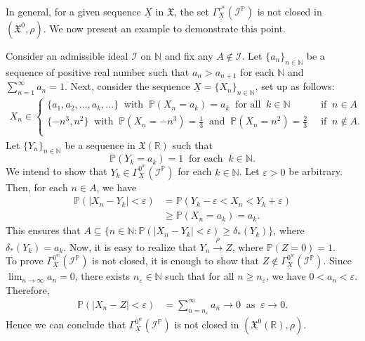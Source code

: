 \documentclass[reqno]{amsart}
\begin{document}
In general, for a given sequence $\underline{X}$ in $\mathfrak{X}$, the set $\Gamma^{r^w}_{\underline{X}}(\mathcal{I}^{\mathbb{P}})$ is not closed in $(\mathfrak{X^0},\rho)$. We now present an example to demonstrate this point.
\begin{example}\label{not closed}
	Consider an admissible ideal $\mathcal{I}$ on $\mathbb{N}$ and fix any $A\notin\mathcal{I}$. Let $\{a_n\}_{n\in\mathbb{N}}$ be a sequence  of positive real number such that $a_n>a_{n+1}$ for each $\mathbb{N}$ and $\displaystyle\sum_{n=1}^{\infty}a_n=1$.  Next, consider the sequence $\underline{X}=\{X_n\}_{n\in\mathbb{N}}$, set up as follows:
	\begin{align*}
		X_{n}\in
		\begin{cases}
			\{a_1,a_2,...,a_k,...\}~\mbox{ with }~ \mathbb{P}(X_n=a_k)=a_k~\mbox{ for all }~k\in\mathbb{N}~&\mbox{ if }	~n\in A\\
			\{-n^3,n^2\}~\mbox{ with }~ \mathbb{P}(X_n=-n^3)=\frac{1}{3}~\mbox{ and }~\mathbb{P}(X_n=n^2)=\frac{2}{3}~&\mbox{ if }~n\notin A.\\
		\end{cases}
	\end{align*}
	Let $\{Y_n\}_{n\in\mathbb{N}}$ be a sequence in $\mathfrak{X}(\mathbb{R})$ such that 
	$$
	\mathbb{P}(Y_k=a_k)=1~\mbox{ for each }~k\in\mathbb{N}.
	$$
	We intend to show that $Y_k\in \Gamma^{0^w}_{\underline{X}}(\mathcal{I}^{\mathbb{P}})$ for each $k\in\mathbb{N}$. Let $\varepsilon>0$ be arbitrary. Then, for each $n\in A$, we have
	\begin{align*}
		\mathbb{P}(|X_n-Y_k|<\varepsilon)&=\mathbb{P}(Y_k-\varepsilon<X_n<Y_k+\varepsilon)\\
		&\geq \mathbb{P}(X_n=a_k)=a_k.
	\end{align*}
	This ensures that $A\subseteq \{n\in\mathbb{N}:\mathbb{P}(|X_n-Y_k|<\varepsilon)\geq \delta_{*}(Y_k)\}$, where $\delta_{*}(Y_k)=a_k$. 
	Now, it is easy to realize that $Y_n\xrightarrow{\rho} Z$, where $\mathbb{P}(Z=0)=1$.\\
	
To prove $\Gamma^{0^w}_{\underline{X}}(\mathcal{I}^{\mathbb{P}})$ is not closed, it is enough to show that $Z\notin \Gamma^{0^w}_{\underline{X}}(\mathcal{I}^{\mathbb{P}})$.
	Since $\displaystyle\lim_{n\to\infty}a_n=0$, there exists $n_{\varepsilon}\in\mathbb{N}$ such that for all $n\geq n_{\varepsilon}$, we have  $0<a_n<\varepsilon$.
	Therefore, 
	\begin{align*}
		\mathbb{P}(|X_n-Z|<\varepsilon)&=\sum_{n=n_{\varepsilon}}^{\infty}a_n\to 0~\mbox{ as }~\varepsilon\to 0.
	\end{align*}
 Hence we can conclude that $\Gamma^{0^w}_{\underline{X}}(\mathcal{I}^{\mathbb{P}})$ is not closed in $(\mathfrak{X^0}(\mathbb{R}),\rho)$.
\end{example}
\end{document}
